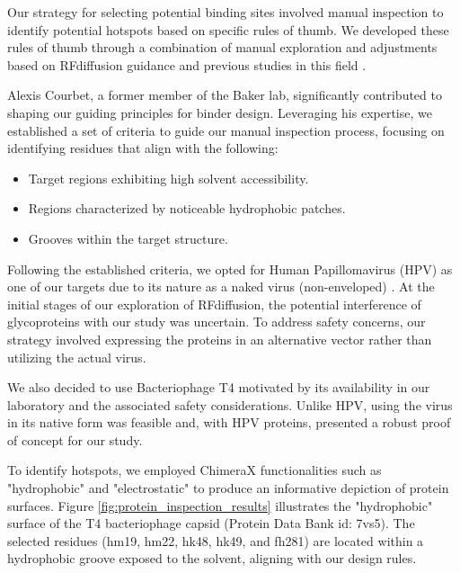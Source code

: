 \documentclass[11pt,a4paper]{article}
\begin{document}
Our strategy for selecting potential binding sites involved manual inspection to identify potential hotspots based on specific rules of thumb. We developed these rules of thumb through a combination of manual exploration and adjustments based on RFdiffusion guidance \cite{rfdiffusion_github} and previous studies in this field \cite{chen2013protein}.

Alexis Courbet, a former member of the Baker lab, significantly contributed to shaping our guiding principles for binder design. Leveraging his expertise, we established a set of criteria to guide our manual inspection process, focusing on identifying residues that align with the following:

\begin{itemize}
\item Target regions exhibiting high solvent accessibility.
\item Regions characterized by noticeable hydrophobic patches.
\item Grooves within the target structure.
\end{itemize}


Following the established criteria, we opted for Human Papillomavirus (HPV) as one of our targets due to its nature as a naked virus (non-enveloped) \cite{morshed2014human}. At the initial stages of our exploration of RFdiffusion, the potential interference of glycoproteins with our study was uncertain. To address safety concerns, our strategy involved expressing the proteins in an alternative vector rather than utilizing the actual virus.

We also decided to use Bacteriophage T4 motivated by its availability in our laboratory and the associated safety considerations. Unlike HPV, using the virus in its native form was feasible and, with HPV proteins, presented a robust proof of concept for our study.

To identify hotspots, we employed ChimeraX functionalities such as "hydrophobic" and "electrostatic" to produce an informative depiction of protein surfaces. Figure \ref{fig:protein_inspection_results} illustrates the "hydrophobic" surface of the T4 bacteriophage capsid (Protein Data Bank id: 7vs5). The selected residues (hm19, hm22, hk48, hk49, and fh281) are located within a hydrophobic groove exposed to the solvent, aligning with our design rules.
\end{document}
